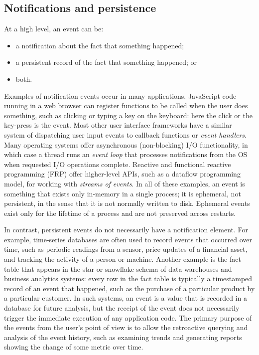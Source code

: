 \documentclass[sigconf,nonacm]{acmart}
\begin{document}
\subsection{Notifications and persistence}

At a high level, an event can be:
\begin{itemize}
\item a notification about the fact that something happened;
\item a persistent record of the fact that something happened; or
\item both.
\end{itemize}

Examples of notification events occur in many applications.
JavaScript code running in a web browser can register functions to be called when the user does something, such as clicking or typing a key on the keyboard: here the click or the key-press is the event.
Most other user interface frameworks have a similar system of dispatching user input events to callback functions or \emph{event handlers}.
Many operating systems offer asynchronous (non-blocking) I/O functionality, in which case a thread runs an \emph{event loop} that processes notifications from the OS when requested I/O operations complete.
Reactive and functional reactive programming (FRP) offer higher-level APIs, such as a dataflow programming model, for working with \emph{streams of events}.
In all of these examples, an event is something that exists only in-memory in a single process; it is ephemeral, not persistent, in the sense that it is not normally written to disk.
Ephemeral events exist only for the lifetime of a process and are not preserved across restarts.

In contrast, persistent events do not necessarily have a notification element.
For example, time-series databases are often used to record events that occurred over time, such as periodic readings from a sensor, price updates of a financial asset, and tracking the activity of a person or machine.
Another example is the fact table that appears in the star or snowflake schema of data warehouses and business analytics systems: every row in the fact table is typically a timestamped record of an event that happened, such as the purchase of a particular product by a particular customer.
In such systems, an event is a value that is recorded in a database for future analysis, but the receipt of the event does not necessarily trigger the immediate execution of any application code.
The primary purpose of the events from the user's point of view is to allow the retroactive querying and analysis of the event history, such as examining trends and generating reports showing the change of some metric over time.
\end{document}
